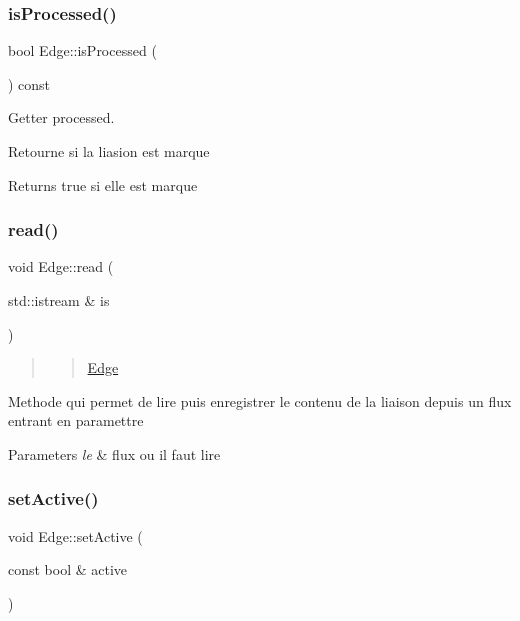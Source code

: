 \subsubsection{\texorpdfstring{is\+Processed()}{isProcessed()}}
{\footnotesize\ttfamily bool Edge\+::is\+Processed (\begin{DoxyParamCaption}{ }\end{DoxyParamCaption}) const}



Getter processed. 

Retourne si la liasion est marque

\begin{DoxyReturn}{Returns}
true si elle est marque 
\end{DoxyReturn}
\mbox{\label{class_edge_ab8dc776b635233160f040b8d3544f473}} 
\subsubsection{\texorpdfstring{read()}{read()}}
{\footnotesize\ttfamily void Edge\+::read (\begin{DoxyParamCaption}\item[{std\+::istream \&}]{is }\end{DoxyParamCaption})}



\begin{quote}
\begin{quote}
\mbox{\hyperlink{class_edge}{Edge}}\end{quote}
\end{quote}


Methode qui permet de lire puis enregistrer le contenu de la liaison depuis un flux entrant en paramettre


\begin{DoxyParams}{Parameters}
{\em le} & flux ou il faut lire \\
\hline
\end{DoxyParams}
\mbox{\label{class_edge_ad4b8227dc914a82c495812080e80b6dd}} 
\subsubsection{\texorpdfstring{set\+Active()}{setActive()}}
{\footnotesize\ttfamily void Edge\+::set\+Active (\begin{DoxyParamCaption}\item[{const bool \&}]{active }\end{DoxyParamCaption})}



